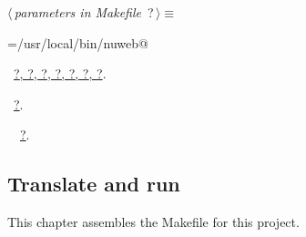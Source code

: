 \documentclass[twoside]{artikel3}
\renewcommand{\NWlink}[2]{\hyperlink{#1}{#2}}
\renewcommand{\NWtarget}[2]{\hypertarget{#1}{#2}}
\renewcommand{\NWsep}{$\diamond$\rule[-1\baselineskip]{0pt}{1\baselineskip}}
\renewcommand{\NWlink}[2]{\hyperlink{#1}{#2}}
\renewcommand{\NWtarget}[2]{\hypertarget{#1}{#2}}
\begin{document}
\begin{flushleft} \small
\begin{minipage}{\linewidth}\label{scrap6}\raggedright\small
\NWtarget{nuweb?}{} $\langle\,${\itshape parameters in Makefile}\nobreak\ {\footnotesize {?}}$\,\rangle\equiv$
\vspace{-1ex}
\begin{list}{}{} \item
\mbox{}\verb@NUWEB=/usr/local/bin/nuweb@\\
\mbox{}\verb@@{\NWsep}
\end{list}
\vspace{-1.5ex}
\footnotesize
\begin{list}{}{\setlength{\itemsep}{-\parsep}\setlength{\itemindent}{-\leftmargin}}
\item \NWtxtMacroDefBy\ \NWlink{nuweb?}{?}\NWlink{nuweb?}{, ?}\NWlink{nuweb?}{, ?}\NWlink{nuweb?}{, ?}\NWlink{nuweb?}{, ?}\NWlink{nuweb?}{, ?}\NWlink{nuweb?}{, ?}.
\item \NWtxtMacroRefIn\ \NWlink{nuweb?}{?}.
\item \NWtxtIdentsUsed\nobreak\  \verb@nuweb@\nobreak\ \NWlink{nuweb?}{?}.
\item{}
\end{list}
\end{minipage}\vspace{4ex}
\end{flushleft}
\subsection{Translate and run}
\label{sec:transrun}

This chapter assembles the Makefile for this project.
\end{document}
